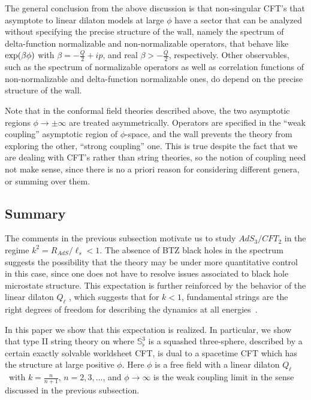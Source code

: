 \documentclass[12pt]{article}
\def\sqsphere{{\bS^3_\flat}}
\def\lstr{\ell_{\textit{s}}}
\newcommand{\bR}{{\mathbb R}}
\newcommand{\bS}{{\mathbb S}}
\numberwithin{equation}{section}
\def\exp{{\rm exp}}
\begin{document}
The general conclusion from the above discussion is that non-singular CFT's that asymptote to linear dilaton models at large $\phi$ have a sector that can be analyzed without specifying the precise structure of the wall, namely the spectrum of delta-function normalizable and non-normalizable operators, that behave like $\exp(\beta\phi)$ with $\beta=-\frac Q2+ip$, and real $\beta>-\frac Q2$, respectively. Other observables, such as the spectrum of normalizable operators as well as correlation functions of non-normalizable and delta-function normalizable ones, do depend on the precise structure of the wall. 

Note that in the conformal field theories described above, the two asymptotic regions $\phi\to\pm\infty$ are treated asymmetrically. Operators are specified in the ``weak coupling'' asymptotic region of $\phi$-space, and the wall prevents the theory from exploring the other, ``strong coupling'' one. This is true despite the fact that we are dealing with CFT's rather than string theories, so the notion of coupling need not make sense, since there is no a priori reason for considering different genera, or summing over them. 




\subsection{Summary} 
\label{sec:summary}

The comments in the previous subsection motivate us to study $AdS_3/CFT_2$ in the regime $k^2=R_{AdS}/\lstr<1$.  The absence of BTZ black holes in the spectrum suggests the possibility that the theory may be under more quantitative control in this case, since one does not have to resolve issues associated to black hole microstate structure. This expectation is further reinforced by the behavior of the linear dilaton $Q_\ell$ \lslope, which suggests that for $k<1$, fundamental strings are the right degrees of freedom for describing the dynamics at all energies~.


In this paper we show that this expectation is realized. In particular, we show that type II string theory on 
\eqn[ourads]{AdS_3\times\sqsphere~,} 
where $\sqsphere$ is a squashed three-sphere, described by a certain exactly solvable worldsheet CFT, is dual to a spacetime CFT which has the structure 
\eqn[ourcft]{\left(\bR_\phi\times \sqsphere\right)^p/S_p}
at large positive $\phi$. Here $\phi$ is a free field with a linear dilaton $Q_\ell$ \lslope\ with $k=\frac{n}{n+1}$, $n=2,3,\dots$, and $\phi\to\infty$ is the weak coupling limit in the sense discussed in the previous subsection.  
\end{document}

